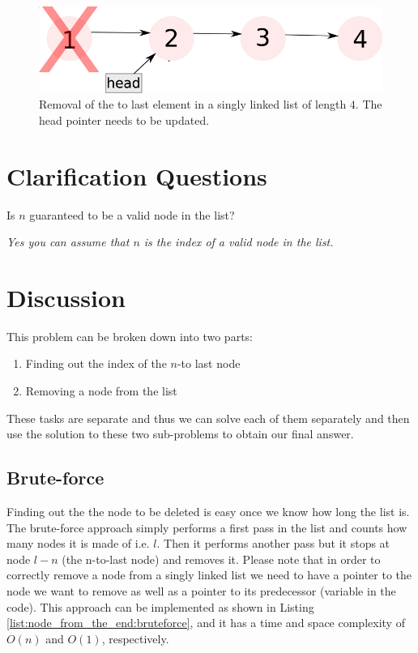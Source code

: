 \begin{figure}
	\label{fig:node_from_the_end:example2}
	\centering
	\includegraphics[scale=1.0]{sources/node_from_the_end/images/example2}
	\caption{Removal of the  to last element in a singly linked list of length $4$. The head pointer needs to be updated.}
\end{figure}


\section{Clarification Questions}

\begin{QandA}
	\begin{questionitem} \begin{question} Is $n$ guaranteed to be a valid node in the list?  \end{question} 	 
    \begin{answered}
		\textit{Yes you can assume that $n$ is the index of a valid node in the list.}
	\end{answered} \end{questionitem}
\end{QandA}

\section{Discussion}
\label{node_from_the_end:sec:discussion}
This problem can be broken down into two parts: 
\begin{enumerate}
	\item Finding out the index of the $n$-to last node
	\item Removing a node from the list
\end{enumerate}
These tasks are separate and thus we can solve each of them separately and then use the solution to these two sub-problems to obtain our final answer.

\subsection{Brute-force}
\label{node_from_the_end:sec:bruteforce}
Finding out the the node to be deleted is easy once we know how long the list is. The brute-force approach simply performs a first pass in the list and counts how many nodes it is made of i.e. $l$. Then it performs another pass but it stops at node $l-n$ (the n-to-last node) and removes it.
Please note that in order to correctly remove a node from a singly linked list  we need to have a pointer to the node we want to remove as well as a pointer to its predecessor (variable  in the code). This approach can be implemented as shown in Listing \ref{list:node_from_the_end:bruteforce}, and it has a time and space complexity of  $O(n)$ and $O(1)$, respectively.


